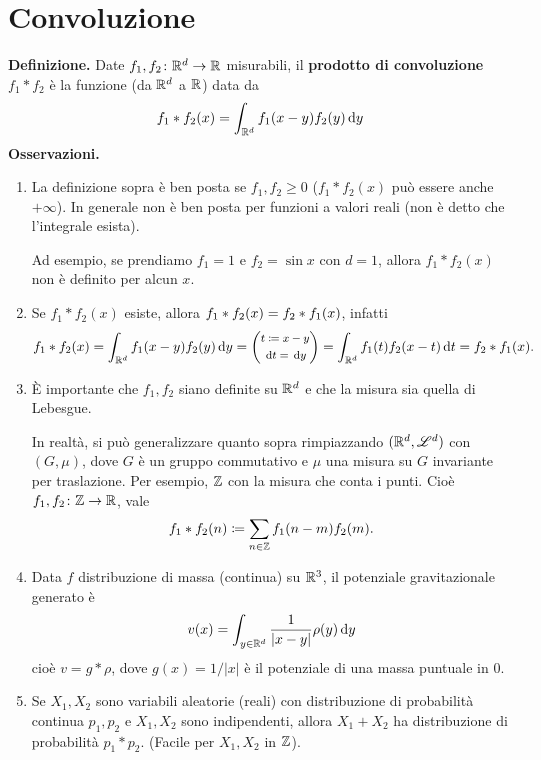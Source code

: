 %
%

\chapter{Convoluzione}

\textbf{Definizione.} Date $f_1,f_2 \colon  \mathbb R^d \to \mathbb R$ misurabili, il \textbf{prodotto di convoluzione} $f_1 \ast f_2$ è la funzione (da $\mathbb R^d$ a $\mathbb R$) data da
%
$$
	f_1 \ast f_2(x) = \int_{\mathbb R^d} f_1(x-y) f_2(y) \,\mathrm{d} y
$$
%
%
\textbf{Osservazioni.}
\begin{enumerate}
\item La definizione sopra è ben posta se $f_1,f_2 \geq 0$ ($f_1 \ast f_2(x)$ può essere anche $+\infty$).
In generale non è ben posta per funzioni a valori reali (non è detto che l'integrale esista). 

Ad esempio, se prendiamo $f_1 = 1$ e $f_2 = \sin x$ con $d = 1$, allora $f_1 \ast f_2(x)$ non è definito per alcun $x$.


\item Se $f_1 \ast f_2(x)$ esiste, allora $\displaystyle f_1 \ast f_2(x) = f_2 \ast f_1(x)$, infatti
%
$$
	f_1 \ast f_2 (x) 
	= \int_{\mathbb R^d} f_1(x-y) f_2(y) \,\mathrm{d} y 
	= \left( 
	{\footnotesize \begin{gathered}
		t \coloneqq x - y \\ 
		\,\mathrm{d} t = \,\mathrm{d} y
	\end{gathered}}
	\right) =
	\int_{\mathbb R^d} f_1(t) f_2(x-t) \,\mathrm{d} t 
	= f_2 \ast f_1(x).
$$
%

\item È importante che $f_1,f_2$ siano definite su $\mathbb R^d$ e che la misura sia quella di Lebesgue.

In realtà, si può generalizzare quanto sopra rimpiazzando $(\mathbb R^d, \mathscr L^d)$ con $(G,\mu)$, dove $G$ è un gruppo commutativo e $\mu$ una misura su $G$ invariante per traslazione. Per esempio, $\mathbb Z$ con la misura che conta i punti. Cioè $f_1,f_2 \colon \mathbb Z \to \mathbb R$, vale
%
$$
	f_1 \ast f_2(n) \coloneqq \sum_{n \in \mathbb Z} f_1(n - m) f_2(m).
$$
%

\item Data $f$ distribuzione di massa (continua) su $\mathbb R^3$, il potenziale gravitazionale generato è
%
$$
	v(x) = \int_{y \in \mathbb R^d} \frac{1}{\left| x - y \right|} \rho(y) \,\mathrm{d} y
$$
%
cioè $v = g \ast \rho$, dove  $g (x) = 1 / \left| x \right|$ è il potenziale di una massa puntuale in $0$.

\item Se $X_1, X_2$ sono variabili aleatorie (reali) con distribuzione di probabilità continua $p_1,p_2$ e $X_1,X_2$ sono indipendenti, allora $X_1 + X_2$ ha distribuzione di probabilità $p_1 \ast p_2$. (Facile per $X_1,X_2$ in $\mathbb Z$).

\end{enumerate}
